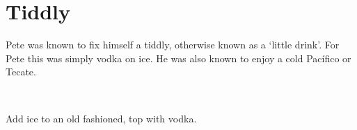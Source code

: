 \section[Tiddly]{Tiddly~}


\begin{recipestats}[
	servings=1,
	preptime=5~\minute,
	original=Pete Teresi,
]
\end{recipestats}

\begin{recipeabstract}
	Pete was known to fix himself a tiddly, otherwise known as a `little drink'.
	For Pete this was simply vodka on ice.
	He was also known to enjoy a cold Pac\'{i}fico or Tecate.
\end{recipeabstract}


\begin{ingredientcolumns}[1]
	\begin{ingredientblock}
		\\
	\end{ingredientblock}
\end{ingredientcolumns}


\begin{preparation}
\item Add ice to an old fashioned, top with vodka.
\end{preparation}


\recipeend%

